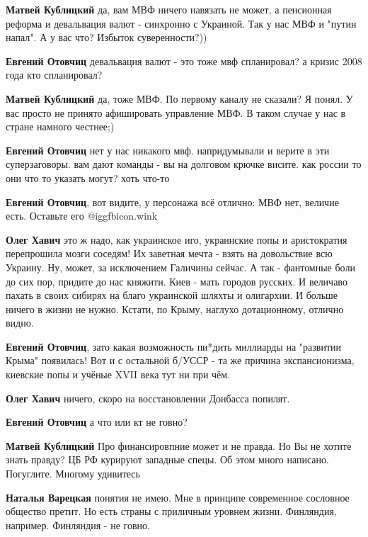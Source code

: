 \begin{itemize}
\begin{itemize}
\textbf{Матвей Кублицкий} да, вам МВФ ничего навязать не может, а пенсионная реформа и девальвация валют - синхронно с Украиной.
Так у нас МВФ и "путин напал". А у вас что? Избыток суверенности?))

\textbf{Евгений Отовчиц} девальвация валют - это тоже мвф спланировал? а кризис 2008 года кто спланировал?

\textbf{Матвей Кублицкий} да, тоже МВФ. По первому каналу не сказали?
Я понял. У вас просто не принято афишировать управление МВФ. В таком случае у нас в стране намного честнее;)

\textbf{Евгений Отовчиц} нет у нас никакого мвф. напридумывали и верите в эти суперзаговоры. вам дают команды - вы на долговом крючке висите. как россии то они что то указать могут? хоть что-то

\textbf{Евгений Отовчиц}, вот видите, у персонажа всё отлично: МВФ нет, величие есть. Оставьте его  @igg{fbicon.wink} 

\textbf{Олег Хавич} это ж надо, как украинское иго, украинские попы и аристократия перепрошила мозги соседям! Их заветная мечта - взять на довольствие всю Украину. Ну, может, за исключением Галичины сейчас.
А так - фантомные боли до сих пор, придите до нас княжити. Киев - мать городов русских. И величаво пахать в своих сибирях на благо украинской шляхты и олигархии.
И больше ничего в жизни не нужно.
Кстати, по Крыму, наглухо дотационному, отлично видно.

\textbf{Евгений Отовчиц}, зато какая возможность пи*дить миллиарды на "развитии Крыма" появилась! Вот и с остальной б/УССР - та же причина экспансионизма, киевские попы и учёные XVII века тут ни при чём.

\textbf{Олег Хавич} ничего, скоро на восстановлении Донбасса попилят.

\textbf{Евгений Отовчиц} а что или кт не говно?

\textbf{Матвей Кублицкий} Про финансировпние может и не правда. Но Вы не хотите знать правду? ЦБ РФ курируют западные спецы. Об этом много написано. Погуглите. Многому удивитесь

\textbf{Наталья Варецкая} понятия не имею. Мне в принципе современное сословное общество претит.
Но есть страны с приличным уровнем жизни. Финляндия, например. Финляндия - не говно.


\end{itemize}
\end{itemize}
